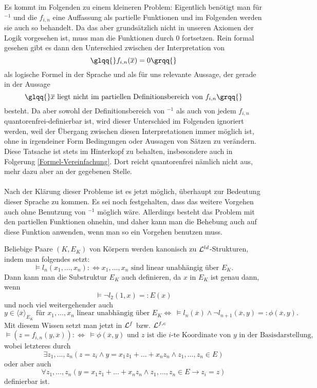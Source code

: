     Es kommt im Folgenden zu einem kleineren Problem: Eigentlich benötigt man für $^{-1}$ und die $f_{i,n}$ eine Auffassung als partielle Funktionen und im Folgenden werden sie auch so behandelt. Da das aber grundsätzlich nicht in unseren Axiomen der Logik vorgesehen ist, muss man die Funktionen durch $0$ fortsetzen. Rein formal gesehen gibt es dann den Unterschied zwischen der Interpretation von $$\glqq{}f_{i,n}(\overline{x})=0\grqq{}$$ als logische Formel in der Sprache und als für uns relevante Aussage, der gerade in der Aussage $$\glqq{}\overline{x}\text{ liegt nicht im partiellen Definitionsbereich von }f_{i,n}\grqq{}$$ besteht.\newpage
    Da aber sowohl der Definitionsbereich von $^{-1}$ als auch von jedem $f_{i,n}$ quantorenfrei-definierbar ist, wird dieser Unterschied im Folgenden ignoriert werden, weil der Übergang zwischen diesen Interpretationen immer möglich ist, ohne in irgendeiner Form Bedingungen oder Aussagen von Sätzen zu verändern. Diese Tatsache ist stets im Hinterkopf zu behalten, insbesondere auch in Folgerung \ref{Formel-Vereinfachung}. Dort reicht quantorenfrei nämlich nicht aus, mehr dazu aber an der gegebenen Stelle.\\\\
    Nach der Klärung dieser Probleme ist es jetzt möglich, überhaupt zur Bedeutung dieser Sprache zu kommen. Es sei noch festgehalten, dass das weitere Vorgehen auch ohne Benutzung von \glqq{}$^{-1}$\grqq{} möglich wäre. Allerdings besteht das Problem mit den partiellen Funktionen ohnehin, und daher kann man die Behebung auch auf diese Funktion anwenden, wenn man so ein Vorgehen benutzen muss.
    
    \begin{lemma}\label{Symbolik}
    	Beliebige Paare $(K,E_K)$ von Körpern werden kanonisch zu $\mathcal{L}^{ld}$-Strukturen, indem man folgendes setzt:
    	$$\models l_n(x_1,\dots,x_n):\Leftrightarrow x_1,\dots,x_n\text{ sind linear unabhängig über }E_K.$$
    	Dann kann man die Substruktur $E_K$ auch definieren, da $x$ in $E_K$ ist genau dann, wenn $$\models\neg l_2(1,x)=:E(x)$$ und noch viel weitergehender auch $$y\in\langle\overline{x}\rangle_{E_K}\text{ für } x_1,\dots,x_n\text{ linear unabhängig über }E_K\Leftrightarrow\ \models l_n(\overline{x})\land\neg l_{n+1}(\overline{x},y)=:\phi(\overline{x},y).$$
    	Mit diesem Wissen setzt man jetzt in $\mathcal{L}^f$ bzw. $\mathcal{L}^{f,c}$
    	$$\models (z=f_{i,n}(y,\overline{x})):\Leftrightarrow\ \models\phi(\overline{x},y)\text{ und }z\text{ ist die }i\text{-te Koordinate von }y\text{ in der Basisdarstellung},$$
    	wobei letzteres durch $$\exists z_1,\dots,z_n(z=z_i\land y=x_1z_1+\dots+x_nz_n\land z_1,\dots,z_n\in E)$$ oder aber auch $$\forall z_1,\dots,z_n(y=x_1z_1+\dots+x_nz_n\land z_1,\dots,z_n\in E\rightarrow z_i=z)$$ definierbar ist.
    \end{lemma}
    
